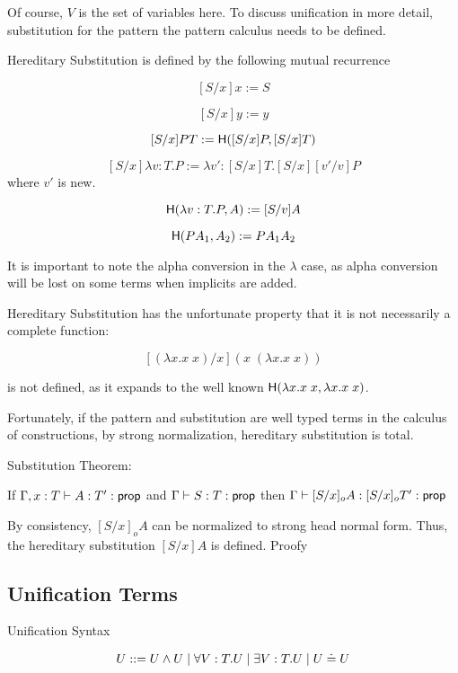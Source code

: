 Of course, $V$ is the set of variables here.
To discuss unification in more detail, substitution for the pattern the pattern calculus
needs to be defined.

\begin{definition}
Hereditary Substitution is defined by the following mutual recurrence

\[
[S/x] x := S
\]

\[
[S/x] y := y
\]

\[
[S/x] P T := \mathsf{H}([S/x] P, [S/x]T)
\]

\[
[S/x] \lambda v : T . P := \lambda v' : [S/x]T . [S/x][v'/v]P
\] where $v'$ is new.

\[
\mathsf{H}(\lambda v : T . P , A) := [S/v] A
\]

\[ 
\mathsf{H}(P A_1 , A_2) := P A_1 A_2
\] 

\end{definition}

It is important to note the alpha conversion in the $\lambda$ case, as alpha conversion will be lost on 
some terms when implicits are added.

Hereditary Substitution has the unfortunate property that it is not necessarily a complete function:

\[
[(\lambda x . x\; x) / x ] ( x \; (\lambda x . x\; x) )
\]

is not defined, as it expands to the well known $\mathsf{H}(\lambda x . x \; x , \lambda x . x \; x)$.

Fortunately, if the pattern and substitution are well typed terms in the calculus of constructions, by 
strong normalization, hereditary substitution is total.

\begin{theorem} Substitution Theorem:

If $\Gamma,x : T \vdash A : T' : \mathsf{prop}$  and $\Gamma \vdash S : T : \mathsf{prop}$ then
$ \Gamma \vdash [S/x]_o A : [S/x]_o T' : \mathsf{prop}$
\end{theorem}

By consistency, $[S/x]_o A $ can be normalized to strong head normal form.  Thus, the 
hereditary substitution $[S/x] A$ is defined. Proofy

\subsection{Unification Terms}

\begin{definition}
Unification Syntax

\[
U ::= U \wedge U 
 \; | \; \forall V : T . U
 \; | \; \exists V : T . U 
 \; | \; U \doteq U
\]

\end{definition}

